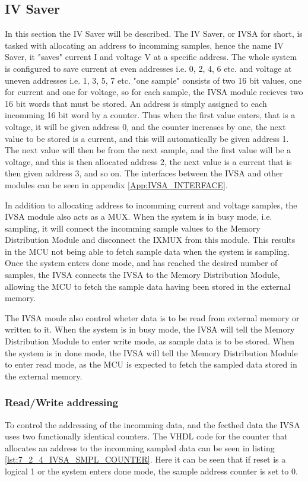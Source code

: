 \subsection{IV Saver} \label{subsec:IVSA}
In this section the IV Saver will be described. The IV Saver, or IVSA for short, is tasked with allocating an address to incomming samples, hence the name IV Saver, it "saves" current I and voltage V at a specific address. The whole system is configured to save current at even addresses i.e. 0, 2, 4, 6 etc. and voltage at uneven addresses i.e. 1, 3, 5, 7 etc. "one sample" consists of two 16 bit values, one for current and one for voltage, so for each sample, the IVSA module recieves two 16 bit words that must be stored. An address is simply assigned to each incomming 16 bit word by a counter. Thus when the first value enters, that is a voltage, it will be given address 0, and the counter increases by one, the next value to be stored is a current, and this will automatically be given address 1. The next value will then be from the next sample, and the first value will be a voltage, and this is then allocated address 2, the next value is a current that is then given address 3, and so on. The interfaces between the IVSA and other modules can be seen in appendix \ref{App:IVSA_INTERFACE}.

In addition to allocating address to incomming current and voltage samples, the IVSA module also acts as a MUX. When the system is in busy mode, i.e. sampling, it will connect the incomming sample values to the Memory Distribution Module and disconnect the IXMUX from this module. This results in the MCU not being able to fetch sample data when the system is sampling. Once the system enters done mode, and has reached the desired number of samples, the IVSA connects the IVSA to the Memory Distribution Module, allowing the MCU to fetch the sample data having been stored in the external memory. 

The IVSA moule also control wheter data is to be read from external memory or written to it. When the system is in busy mode, the IVSA will tell the Memory Distribution Module to enter write mode, as sample data is to be stored. When the system is in done mode, the IVSA will tell the Memory Distribution Module to enter read mode, as the MCU is expected to fetch the sampled data stored in the external memory.

\subsubsection{Read/Write addressing}
To control the addressing of the incomming data, and the fecthed data the IVSA uses two functionally identical counters. The VHDL code for the counter that allocates an address to the incomming sampled data can be seen in listing \ref{lst:7_2_4_IVSA_SMPL_COUNTER}. Here it can be seen that if reset is a logical 1 or the system enters done mode, the sample address counter is set to 0.

